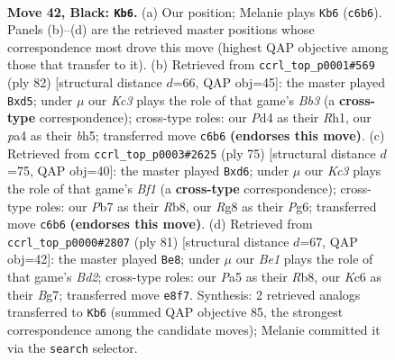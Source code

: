\documentclass[11pt]{article}
\begin{document}
\clearpage

\begin{figure}[p]\centering
\begin{subfigure}{0.46\textwidth}\centering
\resizebox{\linewidth}{!}{%
\newchessgame
\chessboard[
  setfen={r2bb1r1/1p5p/n1kN2pP/p3Pp2/P2p4/3R2P1/1B2N2K/R7 b - - 9 42},
  showmover=false,
  pgfstyle=straightmove, color=movearrow, markmove={c6-b6}
]}
\caption{}
\end{subfigure}\hfill
\begin{subfigure}{0.46\textwidth}\centering
\resizebox{\linewidth}{!}{%
\newchessgame
\chessboard[
  setfen={3rr3/pk4p1/1pp5/3n1p1b/P2P1B1P/1BP1P3/1R4K1/7R w - - 2 42},
  showmover=false,
  pgfstyle=straightmove, color=movearrow, markmove={b3-d5}
]}
\caption{}
\end{subfigure}
\\[4pt]
\begin{subfigure}{0.46\textwidth}\centering
\resizebox{\linewidth}{!}{%
\newchessgame
\chessboard[
  setfen={1r3b2/6k1/1p1N2p1/5p1p/2rp3P/2n1PBPN/3R1P1K/R7 b - - 0 38},
  showmover=false,
  pgfstyle=straightmove, color=movearrow, markmove={f8-d6}
]}
\caption{}
\end{subfigure}\hfill
\begin{subfigure}{0.46\textwidth}\centering
\resizebox{\linewidth}{!}{%
\newchessgame
\chessboard[
  setfen={1r4k1/r2b2b1/6p1/2R1NpPp/p3p3/P1P5/1PB1RPP1/6K1 b - - 1 41},
  showmover=false,
  pgfstyle=straightmove, color=movearrow, markmove={d7-e8}
]}
\caption{}
\end{subfigure}
\caption{\textbf{Move 42, Black: \texttt{Kb6}.} (a) Our position; Melanie plays \texttt{Kb6} (\texttt{c6b6}). Panels (b)--(d) are the retrieved master positions whose correspondence most drove this move (highest QAP objective among those that transfer to it). (b) Retrieved from \texttt{ccrl\_top\_p0001\#569} (ply 82) [structural distance $d$=66, QAP obj=45]: the master played \texttt{Bxd5}; under $\mu$ our \emph{Kc3} plays the role of that game's \emph{Bb3} (a \textbf{cross-type} correspondence); cross-type roles: our \emph{P}d4 as their \emph{R}h1, our \emph{p}a4 as their \emph{b}h5; transferred move \texttt{c6b6} \textbf{(endorses this move)}. (c) Retrieved from \texttt{ccrl\_top\_p0003\#2625} (ply 75) [structural distance $d$=75, QAP obj=40]: the master played \texttt{Bxd6}; under $\mu$ our \emph{Kc3} plays the role of that game's \emph{Bf1} (a \textbf{cross-type} correspondence); cross-type roles: our \emph{P}b7 as their \emph{R}b8, our \emph{R}g8 as their \emph{P}g6; transferred move \texttt{c6b6} \textbf{(endorses this move)}. (d) Retrieved from \texttt{ccrl\_top\_p0000\#2807} (ply 81) [structural distance $d$=67, QAP obj=42]: the master played \texttt{Be8}; under $\mu$ our \emph{Be1} plays the role of that game's \emph{Bd2}; cross-type roles: our \emph{P}a5 as their \emph{R}b8, our \emph{K}c6 as their \emph{B}g7; transferred move \texttt{e8f7}. Synthesis: 2 retrieved analogs transferred to \texttt{Kb6} (summed QAP objective 85, the strongest correspondence among the candidate moves); Melanie committed it via the \texttt{search} selector.}
\label{fig:thought-m83}
\end{figure}
\end{document}
